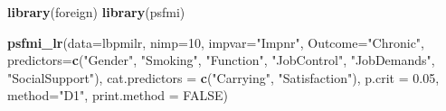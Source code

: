 \documentclass[]{book}
\newenvironment{Shaded}{\begin{snugshade}}{\end{snugshade}}
\newcommand{\KeywordTok}[1]{\textcolor[rgb]{0.13,0.29,0.53}{\textbf{#1}}}
\newcommand{\DataTypeTok}[1]{\textcolor[rgb]{0.13,0.29,0.53}{#1}}
\newcommand{\DecValTok}[1]{\textcolor[rgb]{0.00,0.00,0.81}{#1}}
\newcommand{\FloatTok}[1]{\textcolor[rgb]{0.00,0.00,0.81}{#1}}
\newcommand{\StringTok}[1]{\textcolor[rgb]{0.31,0.60,0.02}{#1}}
\newcommand{\OtherTok}[1]{\textcolor[rgb]{0.56,0.35,0.01}{#1}}
\newcommand{\NormalTok}[1]{#1}
\begin{document}
\begin{Shaded}
\begin{Highlighting}[]
\KeywordTok{library}\NormalTok{(foreign)}
\KeywordTok{library}\NormalTok{(psfmi)}

\KeywordTok{psfmi_lr}\NormalTok{(}\DataTypeTok{data=}\NormalTok{lbpmilr, }\DataTypeTok{nimp=}\DecValTok{10}\NormalTok{, }\DataTypeTok{impvar=}\StringTok{"Impnr"}\NormalTok{, }\DataTypeTok{Outcome=}\StringTok{"Chronic"}\NormalTok{,}
  \DataTypeTok{predictors=}\KeywordTok{c}\NormalTok{(}\StringTok{"Gender"}\NormalTok{, }\StringTok{"Smoking"}\NormalTok{, }\StringTok{"Function"}\NormalTok{, }\StringTok{"JobControl"}\NormalTok{, }\StringTok{"JobDemands"}\NormalTok{,}
  \StringTok{"SocialSupport"}\NormalTok{), }\DataTypeTok{cat.predictors =} \KeywordTok{c}\NormalTok{(}\StringTok{"Carrying"}\NormalTok{, }\StringTok{"Satisfaction"}\NormalTok{), }
  \DataTypeTok{p.crit =} \FloatTok{0.05}\NormalTok{, }\DataTypeTok{method=}\StringTok{"D1"}\NormalTok{, }\DataTypeTok{print.method =} \OtherTok{FALSE}\NormalTok{)}
\end{Highlighting}
\end{Shaded}
\end{document}
